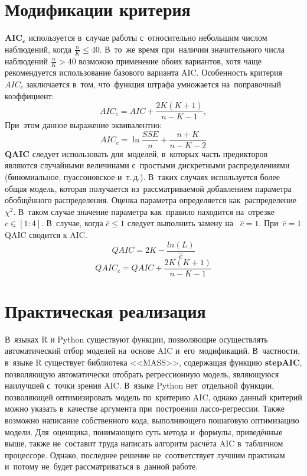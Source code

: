 \documentclass[]{scrartcl}
\begin{document}
\section{Модификации критерия}
$\mathbf{AIC_{c}}$ используется в~случае работы с~относительно небольшим числом наблюдений, когда $\frac{n}{K} \leq 40$. В~то~же время при~наличии значительного числа наблюдений $\frac{n}{K} > 40$ возможно применение обоих вариантов, хотя чаще рекомендуется использование базового варианта AIC.  Особенность критерия $AIC_{c}$ заключается в~том, что~функция штрафа умножается на~поправочный коэффициент:
\begin{equation}\label{AICc-1}
AIC_{c} = AIC + \frac{2K(K+1)}{n-K-1},
\end{equation}
При~этом данное выражение эквивалентно:
\begin{equation}\label{AICc-2}
AIC_{c} = \ln\frac{SSE}{n} + \frac{n+K}{n-K-2}
\end{equation} 
\textbf{QAIC} следует использовать для~моделей, в~которых часть предикторов являются случайными величинами с~простыми дискретными распределениями (биномиальное, пуассоновское и~т.\,д.). В~таких случаях используется более общая модель, которая получается из~рассматриваемой добавлением параметра обобщённого распределения. Оценка параметра определяется как~распределение $\chi^2$. В~таком случае значение параметра как~правило находится на~отрезке $ c \in[1:4]$. В~случае, когда $\hat{c} \leq 1$ следует выполнить замену на~ $\hat{c} = 1$. При~$\hat{c} = 1$ QAIC сводится к AIC.
\begin{equation}\label{QAIC}
QAIC = 2K - \frac{ln(L)}{\hat{c}}
\end{equation}
\begin{equation}\label{QAICc}
QAIC_{c} = QAIC + \frac{2K(K+1)}{n-K-1}
\end{equation}

\section{Практическая реализация}
В~языках R и Python существуют функции, позволяющие осуществлять автоматический отбор моделей на~основе AIC и~его~модификаций. В~частности, в~языке R существует библиотека <<MASS>>, содержащая функцию \textbf{stepAIC}, позволяющую автоматически отобрать регрессионную модель, являющуюся наилучшей с~точки зрения AIC. В~языке Python нет~отдельной функции, позволяющей оптимизировать модель по~критерию AIC, однако данный критерий можно указать в~качестве аргумента при~построении лассо-регрессии. Также возможно написание собственного кода, выполняющего пошаговую оптимизацию модели. Для~оценщика, понимающего суть метода и~формулы, приведённые выше, также не~составит труда написать алгоритм расчёта AIC в~табличном процессоре. Однако, последнее решение не~соответствует лучшим практикам и~потому не~будет рассматриваться в~данной работе.
\end{document}
